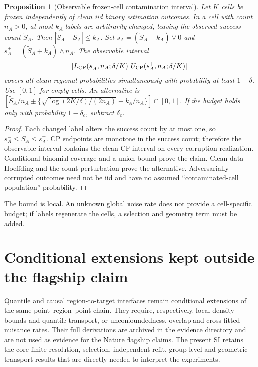 \documentclass[11pt,a4paper]{article}
\numberwithin{equation}{section}
\newtheorem{proposition}[theorem]{Proposition}
\theoremstyle{definition}\newtheorem{definition}[theorem]{Definition}
\theoremstyle{remark}\newtheorem{remark}[theorem]{Remark}
\begin{document}
\begin{proposition}[Observable frozen-cell contamination interval]\label{prop:contam}
Let $K$ cells be frozen independently of clean iid binary estimation outcomes.
In a cell with count $n_A>0$, at most $k_A$ labels are arbitrarily changed,
leaving the observed success count $\widetilde S_A$. Then
$|\widetilde S_A-S_A|\le k_A$. Set
$s_A^-=(\widetilde S_A-k_A)\vee0$ and
$s_A^+=(\widetilde S_A+k_A)\wedge n_A$. The observable interval
\[
 [L_{\rm CP}(s_A^-,n_A;\delta/K),U_{\rm CP}(s_A^+,n_A;\delta/K)]
\]
covers all clean regional probabilities simultaneously with probability at
least $1-\delta$. Use $[0,1]$ for empty cells. An alternative is
$[\widetilde S_A/n_A\pm\{\sqrt{\log(2K/\delta)/(2n_A)}+k_A/n_A\}]\cap[0,1]$.
If the budget holds only with probability $1-\delta_c$, subtract $\delta_c$.
\end{proposition}
\begin{proof}
Each changed label alters the success count by at most one, so
$s_A^-\le S_A\le s_A^+$. CP endpoints are monotone in the success count;
therefore the observable interval contains the clean CP interval on every
corruption realization. Conditional binomial coverage and a union bound prove
the claim. Clean-data Hoeffding and the count perturbation prove the alternative.
Adversarially corrupted outcomes need not be iid and have no assumed
``contaminated-cell population'' probability.\end{proof}
The bound is local. An unknown global noise rate does not provide a cell-specific budget; if labels regenerate the cells, a selection and geometry term must be added.

\section{Conditional extensions kept outside the flagship claim}
Quantile and causal region-to-target interfaces remain conditional extensions of the same point--region--point chain. They require, respectively, local density bounds and quantile transport, or unconfoundedness, overlap and cross-fitted nuisance rates. Their full derivations are archived in the evidence directory and are not used as evidence for the Nature flagship claims. The present SI retains the core finite-resolution, selection, independent-refit, group-level and geometric-transport results that are directly needed to interpret the experiments.
\end{document}
